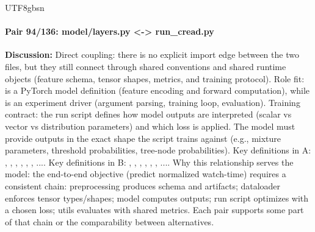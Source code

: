 \documentclass[11pt]{article}
\begin{document}
\begin{CJK*}{UTF8}{gbsn}
\paragraph{Pair 94/136: model/layers.py <-> run\_cread.py}
\textbf{Discussion:} Direct coupling: there is no explicit import edge between the two files, but they still connect through shared conventions and shared runtime objects (feature schema, tensor shapes, metrics, and training protocol). Role fit: \texttt{} is a PyTorch model definition (feature encoding and forward computation), while \texttt{} is an experiment driver (argument parsing, training loop, evaluation). Training contract: the run script defines how model outputs are interpreted (scalar vs vector vs distribution parameters) and which loss is applied. The model must provide outputs in the exact shape the script trains against (e.g., mixture parameters, threshold probabilities, tree-node probabilities). Key definitions in A: \texttt{}, \texttt{}, \texttt{}, \texttt{}, \texttt{}, \texttt{}, .... Key definitions in B: \texttt{}, \texttt{}, \texttt{}, \texttt{}, \texttt{}, \texttt{}, .... Why this relationship serves the model: the end-to-end objective (predict normalized watch-time) requires a consistent chain: preprocessing produces schema and artifacts; dataloader enforces tensor types/shapes; model computes outputs; run script optimizes with a chosen loss; utils evaluates with shared metrics. Each pair supports some part of that chain or the comparability between alternatives.


\end{CJK*}
\end{document}
